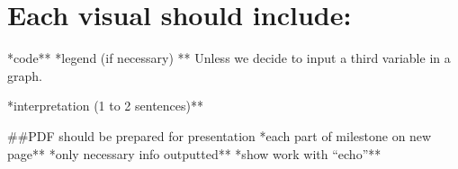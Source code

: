 \documentclass[
]{article}
\begin{document}
\hypertarget{each-visual-should-include}{%
\section{Each visual should include:}\label{each-visual-should-include}}

\newline **code** \newline **legend (if necessary) ** Unless we decide
to input a third variable in a graph.

\newline **interpretation (1 to 2 sentences)**

\#\#PDF should be prepared for presentation \newline**each part of
milestone on new page** \newline**only necessary info outputted**
\newline **show work with ``echo''**
\end{document}
